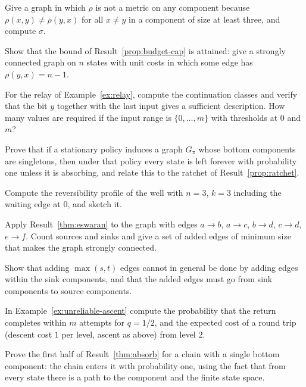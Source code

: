 \begin{exercise}
Give a graph in which $\rho$ is not a metric on any component because $\rho(x,y)\ne\rho(y,x)$ for all $x\ne y$ in a component of size at least three, and compute $\sigma$.
\end{exercise}

\begin{exercise}
Show that the bound of Result~\ref{prop:budget-cap} is attained: give a strongly connected graph on $n$ states with unit costs in which some edge has $\rho(y,x)=n-1$.
\end{exercise}

\begin{exercise}
For the relay of Example~\ref{ex:relay}, compute the continuation classes and verify that the bit $y$ together with the last input gives a sufficient description. How many values are required if the input range is $\{0,\dots,m\}$ with thresholds at $0$ and $m$?
\end{exercise}

\begin{exercise}
Prove that if a stationary policy induces a graph $G_\pi$ whose bottom components are singletons, then under that policy every state is left forever with probability one unless it is absorbing, and relate this to the ratchet of Result~\ref{prop:ratchet}.
\end{exercise}

\begin{exercise}
Compute the reversibility profile of the well with $n=3$, $k=3$ including the waiting edge at $0$, and sketch it.
\end{exercise}

\begin{exercise}
Apply Result~\ref{thm:eswaran} to the graph with edges $a\to b$, $a\to c$, $b\to d$, $c\to d$, $e\to f$. Count sources and sinks and give a set of added edges of minimum size that makes the graph strongly connected.\label{ex2:eswaran}
\end{exercise}

\begin{exercise}
Show that adding $\max(s,t)$ edges cannot in general be done by adding edges within the sink components, and that the added edges must go from sink components to source components.
\end{exercise}

\begin{exercise}
In Example~\ref{ex:unreliable-ascent} compute the probability that the return completes within $m$ attempts for $q=1/2$, and the expected cost of a round trip (descent cost $1$ per level, ascent as above) from level $2$.
\end{exercise}

\begin{exercise}
Prove the first half of Result~\ref{thm:absorb} for a chain with a single bottom component: the chain enters it with probability one, using the fact that from every state there is a path to the component and the finite state space.
\end{exercise}

